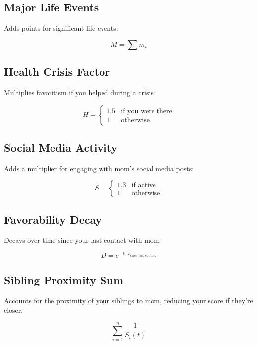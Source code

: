 \documentclass[12pt]{article}
\begin{document}
\subsection{Major Life Events}
Adds points for significant life events:

\begin{equation}
M = \sum m_i
\end{equation}

\subsection{Health Crisis Factor}
Multiplies favoritism if you helped during a crisis:

\begin{equation}
H = \begin{cases}
1.5 & \text{if you were there} \\
1 & \text{otherwise}
\end{cases}
\end{equation}

\subsection{Social Media Activity}
Adds a multiplier for engaging with mom’s social media posts:

\begin{equation}
S = \begin{cases}
1.3 & \text{if active} \\
1 & \text{otherwise}
\end{cases}
\end{equation}

\subsection{Favorability Decay}
Decays over time since your last contact with mom:

\begin{equation}
D = e^{-k \cdot t_{\text{since\_last\_contact}}}
\end{equation}

\subsection{Sibling Proximity Sum}
Accounts for the proximity of your siblings to mom, reducing your score if they’re closer:

\begin{equation}
\sum_{i=1}^{n} \frac{1}{S_i(t)}
\end{equation}
\end{document}
